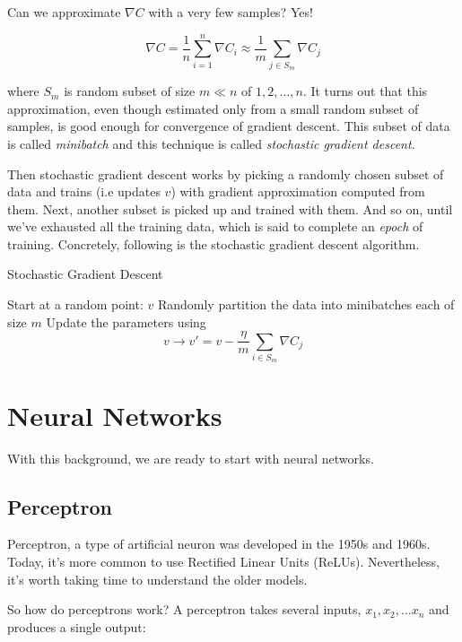 \documentclass[a4paper]{tufte-handout}
\begin{document}
Can we approximate \(\nabla C\) with a very few samples? Yes!

\[ \nabla C = \frac{1}{n} \sum_{i = 1}^{n} \nabla C_i \approx \frac{1}{m} \sum_{j \in S_m} \nabla C_j \]

where \(S_m\) is random subset of size \(m \ll n\) of
\({1, 2, \ldots,n}\). It turns out that this approximation, even though
estimated only from a small random subset of samples, is good enough for
convergence of gradient descent. This subset of data is called
\emph{minibatch} and this technique is called \emph{stochastic gradient
descent}.

Then stochastic gradient descent works by picking a randomly chosen
subset of data and trains (i.e updates \(v\)) with gradient
approximation computed from them. Next, another subset is picked up and
trained with them. And so on, until we've exhausted all the training
data, which is said to complete an \emph{epoch} of training. Concretely,
following is the stochastic gradient descent algorithm.

\begin{algorithm}
\caption{Stochastic Gradient Descent}
\begin{algorithmic}[1]
  \STATE Start at a random point: \(v\)
      \STATE Randomly partition the data into minibatches each of size $m$ 
        \STATE Update the parameters using \[v \rightarrow v' = v -\frac{\eta}{m} \sum_{i \in S_m} \nabla C_j\]
      \ENDFOR
  \ENDFOR
\end{algorithmic}
\end{algorithm}

\section{Neural Networks}\label{neural-networks}

With this background, we are ready to start with neural networks.

\subsection{Perceptron}\label{perceptron}

Perceptron, a type of artificial neuron was developed in the 1950s and
1960s. Today, it's more common to use Rectified Linear Units (ReLUs).
Nevertheless, it's worth taking time to understand the older models.

So how do perceptrons work? A perceptron takes several inputs,
\(x_1, x_2, \ldots x_n\) and produces a single output:
\end{document}
